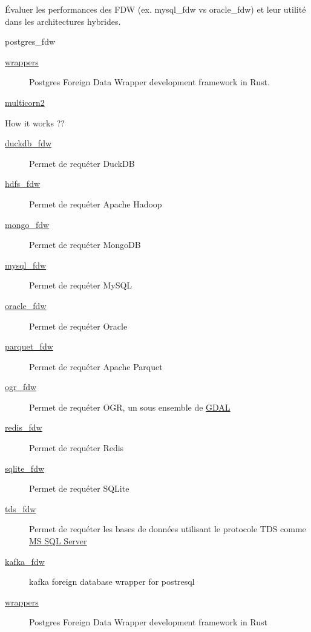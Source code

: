 \documentclass[a4paper,12pt]{article}
\begin{document}
\begin{multicols*}{2}
Évaluer les performances des FDW (ex. mysql\_fdw vs oracle\_fdw) et leur utilité dans les architectures hybrides.

postgres\_fdw
\begin{description}
\item[{\href{https://github.com/supabase/wrappers}{wrappers}}] Postgres Foreign Data Wrapper development framework in Rust.
\item[{\href{https://github.com/pgsql-io/multicorn2}{multicorn2}}] 
\end{description}

How it works ??
\begin{description}
\item[{\href{https://github.com/alitrack/duckdb\_fdw}{duckdb\_fdw}}] Permet de requéter DuckDB
\item[{\href{https://github.com/EnterpriseDB/hdfs\_fdw}{hdfs\_fdw}}] Permet de requéter Apache Hadoop
\item[{\href{https://github.com/EnterpriseDB/mongo\_fdw}{mongo\_fdw}}] Permet de requéter MongoDB
\item[{\href{https://github.com/EnterpriseDB/mysql\_fdw}{mysql\_fdw}}] Permet de requéter MySQL
\item[{\href{https://github.com/laurenz/oracle\_fdw}{oracle\_fdw}}] Permet de requéter Oracle
\item[{\href{https://github.com/adjust/parquet\_fdw}{parquet\_fdw}}] Permet de requéter Apache Parquet
\item[{\href{https://github.com/pramsey/pgsql-ogr-fdw}{ogr\_fdw}}] Permet de requéter OGR, un sous ensemble de \href{http://www.gdal.org/}{GDAL}
\item[{\href{https://github.com/pg-redis-fdw/redis\_fdw}{redis\_fdw}}] Permet de requéter Redis
\item[{\href{https://github.com/pgspider/sqlite\_fdw}{sqlite\_fdw}}] Permet de requéter SQLite
\item[{\href{https://github.com/tds-fdw/tds\_fdw?tab=readme-ov-file}{tds\_fdw}}] Permet de requéter les bases de données utilisant le protocole TDS comme \href{https://www.microsoft.com/fr-fr/sql-server/}{MS SQL Server}
\item[{\href{https://github.com/adjust/kafka\_fdw}{kafka\_fdw}}] kafka foreign database wrapper for postresql
\item[{\href{https://github.com/supabase/wrappers}{wrappers}}] Postgres Foreign Data Wrapper development framework in Rust
\end{description}


\end{multicols*}
\end{document}
